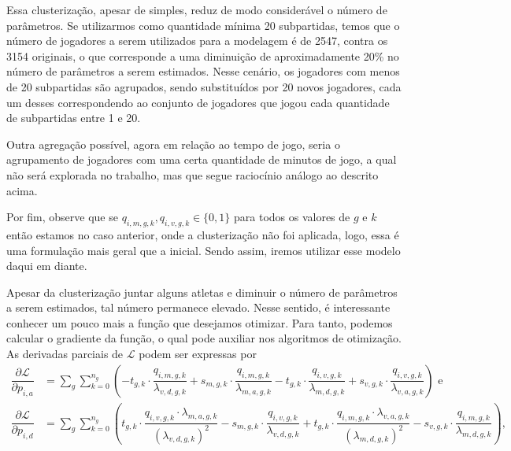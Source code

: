 Essa clusterização, apesar de simples, reduz de modo considerável o número de parâmetros. Se utilizarmos como quantidade mínima 20 subpartidas, temos que o número de jogadores a serem utilizados para a modelagem é de 2547, contra os 3154 originais, o que corresponde a uma diminuição de aproximadamente 20\% no número de parâmetros a serem estimados. Nesse cenário, os jogadores com menos de 20 subpartidas são agrupados, sendo substituídos por 20 novos jogadores, cada um desses correspondendo ao conjunto de jogadores que jogou cada quantidade de subpartidas entre 1 e 20.

Outra agregação possível, agora em relação ao tempo de jogo, seria o agrupamento de jogadores com uma certa quantidade de minutos de jogo, a qual não será explorada no trabalho, mas que segue raciocínio análogo ao descrito acima.

Por fim, observe que se $q_{i, m, g, k}, q_{i, v, g, k} \in \{0, 1\}$ para todos os valores de $g$ e $k$ então estamos no caso anterior, onde a clusterização não foi aplicada, logo, essa é uma formulação mais geral que a inicial. Sendo assim, iremos utilizar esse modelo daqui em diante.

Apesar da clusterização juntar alguns atletas e diminuir o número de parâmetros a serem estimados, tal número permanece elevado. Nesse sentido, é interessante conhecer um pouco mais a função que desejamos otimizar. Para tanto, podemos calcular o gradiente da função, o qual pode auxiliar nos algoritmos de otimização. As derivadas parciais de $\mathcal{L}$ podem ser expressas por
\begin{equation*}
    \begin{split}
        \dfrac{\partial \mathcal{L}}{\partial p_{i, a}} & = \sum_{g}\sum_{k = 0}^{n_g} \left(-t_{g, k}\cdot \dfrac{q_{i, m, g, k}}{\lambda_{v, d, g, k}} + s_{m, g, k}\cdot \dfrac{q_{i, m, g, k}}{\lambda_{m, a, g, k}} -t_{g, k}\cdot \dfrac{q_{i, v, g, k}}{\lambda_{m, d, g, k}} + s_{v, g, k}\cdot \dfrac{q_{i, v, g, k}}{\lambda_{v, a, g, k}} \right) \text { e} \\
        \dfrac{\partial \mathcal{L}}{\partial p_{i, d}} & = \sum_{g}\sum_{k = 0}^{n_g} \left(t_{g, k}\cdot \dfrac{q_{i, v, g, k}\cdot \lambda_{m, a, g, k}}{\left(\lambda_{v, d, g, k}\right)^2} - s_{m, g, k}\cdot  \dfrac{q_{i, v, g, k}}{\lambda_{v, d, g, k}} + t_{g, k}\cdot \dfrac{q_{i, m, g, k}\cdot \lambda_{v, a, g, k}}{\left(\lambda_{m, d, g, k}\right)^2} - s_{v, g, k}\cdot \dfrac{q_{i, m, g, k}}{\lambda_{m, d, g, k}}\right),
    \end{split}
\end{equation*}

